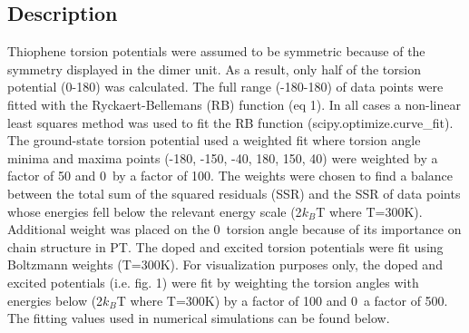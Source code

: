 \subsection{Description}
\label{subsec:TPF_descript}
Thiophene torsion potentials were assumed to be symmetric because of the symmetry displayed in the dimer unit. As a result, only half of the torsion potential (0-180\textdegree) was calculated. The full range (-180-180\textdegree) of data points were fitted with the Ryckaert-Bellemans (RB) function (eq 1). In all cases a non-linear least squares method was used to fit the RB function (scipy.optimize.curve\_fit).\cite{Jones} The ground-state torsion potential used a weighted fit where torsion angle minima and maxima points (-180\textdegree, -150\textdegree, -40\textdegree, 180\textdegree, 150\textdegree, 40\textdegree) were weighted by a factor of 50 and 0\textdegree\ by a factor of 100. The weights were chosen to find a balance between the total sum of the squared residuals (SSR) and the SSR of data points whose energies fell below the relevant energy scale (2$k_B$T where T=300K). Additional weight was placed on the 0\textdegree\ torsion angle because of its importance on chain structure in PT. The doped and excited torsion potentials were fit using Boltzmann weights (T=300K). For visualization purposes only, the doped and excited potentials (i.e. fig. 1) were fit by weighting the torsion angles with energies below (2$k_B$T where T=300K) by a factor of 100 and 0\textdegree\ a factor of 500. The fitting values used in numerical simulations can be found below.

